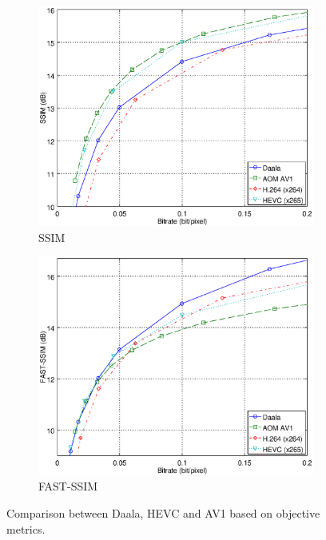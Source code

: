 \documentclass[english,conference,10pt]{IEEEtran}
\begin{document}
\begin{figure}
\begin{subfigure}[t]{0.44\textwidth}
\includegraphics[width=\columnwidth]{ssim.eps}
\caption{SSIM}
\end{subfigure}\hspace{0.12\columnwidth}\begin{subfigure}[t]{0.44\textwidth}
\includegraphics[width=\columnwidth]{fastssim.eps}
\caption{FAST-SSIM}
\end{subfigure}
\caption{Comparison between Daala, HEVC and AV1 based on objective metrics.}\label{fig:metrics}
\end{figure}
\end{document}
